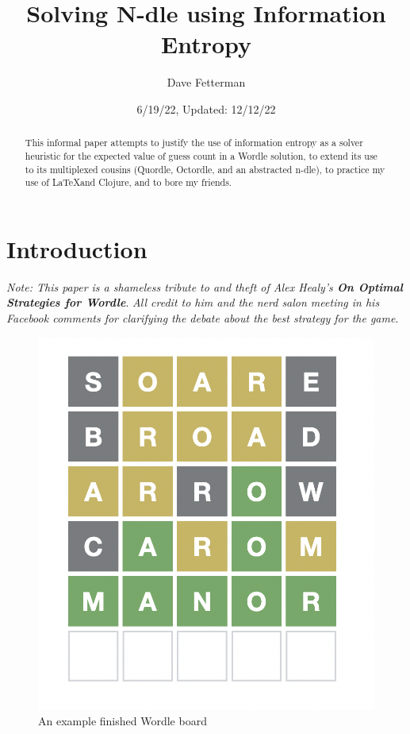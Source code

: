 \documentclass[11pt, oneside]{article} 	%
\title{Solving N-dle using Information Entropy}
\author{Dave Fetterman}
\affil{Obviously Unemployed}
\date{6/19/22, Updated: 12/12/22}
\begin{document}
\maketitle

\begin{abstract}

This informal paper attempts to justify the use of information entropy as a solver heuristic for the expected value of guess count in a Wordle solution, to extend its use to its multiplexed cousins (Quordle, Octordle, and an abstracted n-dle), to practice my use of \LaTeX and Clojure, and to bore my friends.

\end{abstract}

\section{Introduction}

\emph{Note: This paper is a shameless tribute to and theft of Alex Healy's \textbf{On Optimal Strategies for Wordle}}\cite{1}. \emph{All credit to him and the nerd salon meeting in his Facebook comments for clarifying the debate about the best strategy for the game}.
 
\begin{figure}
\centering
\includegraphics[scale=.3]{wordle}
\caption{An example finished Wordle board}
\end{figure}
\end{document}
